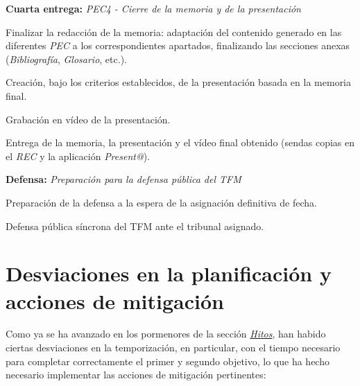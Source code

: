 \documentclass[IB,BIB]{TFUOC}%
\newcommand{\progress}{\ding{46}} %
\begin{document}
\begin{todolist}
  \item[\progress] \textbf{Cuarta entrega:} \textit{PEC4 - Cierre de la memoria y de la presentación}
  \begin{todolist}
  \item[\progress] Finalizar la redacción de la memoria: adaptación del contenido generado en las diferentes \textit{PEC} a los correspondientes apartados, finalizando las secciones anexas (\textit{Bibliografía}, \textit{Glosario}, etc.).
  \item[\progress] Creación, bajo los criterios establecidos, de la presentación basada en la memoria final.
  \item[\progress] Grabación en vídeo de la presentación.
  \item Entrega de la memoria, la presentación y el vídeo final obtenido (sendas copias en el \textit{REC} y la aplicación \textit{Present@}).
  \end{todolist}
\end{todolist}

\begin{todolist}
  \item \textbf{Defensa:} \textit{Preparación para la defensa pública del TFM}
  \begin{todolist}
  \item Preparación de la defensa a la espera de la asignación definitiva de fecha.
  \item Defensa pública síncrona del TFM ante el tribunal asignado.
  \end{todolist}
\end{todolist}


\section{Desviaciones en la planificación y acciones de mitigación}
\label{sec:Desviaciones en la planificación y acciones de mitigación}

Como ya se ha avanzado en los pormenores de la sección \textit{\hyperref[sec:Hitos]{Hitos}}, han habido ciertas desviaciones en la temporización, en particular, con el tiempo necesario para completar correctamente el primer y segundo objetivo, lo que ha hecho necesario implementar las acciones de mitigación pertinentes:

\footnotesize
\end{document}
